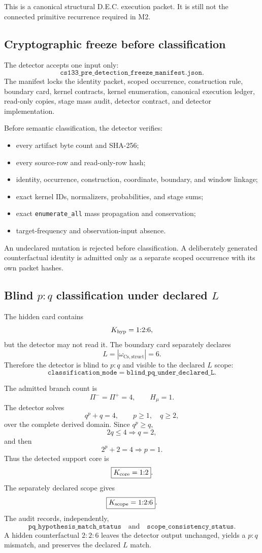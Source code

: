 This is a canonical structural D.E.C. execution packet. It is still not the connected primitive recurrence required in M2.

\subsection{Cryptographic freeze before classification}

The detector accepts one input only:
\[
\texttt{cs133\_pre\_detection\_freeze\_manifest.json}.
\]
The manifest locks the identity packet, scoped occurrence, construction rule, boundary card, kernel contracts, kernel enumeration, canonical execution ledger, read-only copies, stage mass audit, detector contract, and detector implementation.

Before semantic classification, the detector verifies:
\begin{itemize}[leftmargin=2em]
  \item every artifact byte count and SHA-256;
  \item every source-row and read-only-row hash;
  \item identity, occurrence, construction, coordinate, boundary, and window linkage;
  \item exact kernel IDs, normalizers, probabilities, and stage sums;
  \item exact \texttt{enumerate\_all} mass propagation and conservation;
  \item target-frequency and observation-input absence.
\end{itemize}
An undeclared mutation is rejected before classification. A deliberately generated counterfactual identity is admitted only as a separate scoped occurrence with its own packet hashes.

\subsection{Blind \texorpdfstring{$p{:}q$}{p:q} classification under declared \texorpdfstring{$L$}{L}}

The hidden card contains
\[
K_{\rm hyp}=1{:}2{:}6,
\]
but the detector may not read it. The boundary card separately declares
\[
L=|\omega_{\mathrm{Cs,struct}}|=6.
\]
Therefore the detector is blind to \(p{:}q\) and visible to the declared \(L\) scope:
\[
\boxed{\texttt{classification\_mode}=\texttt{blind\_pq\_under\_declared\_L}.}
\]

The admitted branch count is
\[
\Pi^- = \Pi^+ = 4,
\qquad
H_\mu=1.
\]
The detector solves
\[
q^p+q=4,
\qquad p\ge1,
\quad q\ge2,
\]
over the complete derived domain. Since \(q^p\ge q\),
\[
2q\le4\Longrightarrow q=2,
\]
and then
\[
2^p+2=4\Longrightarrow p=1.
\]
Thus the detected support core is
\[
\boxed{K_{\rm core}=1{:}2}.
\]
The separately declared scope gives
\[
\boxed{K_{\rm scope}=1{:}2{:}6}.
\]
The audit records, independently,
\[
\texttt{pq\_hypothesis\_match\_status}
\quad\text{and}\quad
\texttt{scope\_consistency\_status}.
\]
A hidden counterfactual \(2{:}2{:}6\) leaves the detector output unchanged, yields a \(p{:}q\) mismatch, and preserves the declared \(L\) match.

